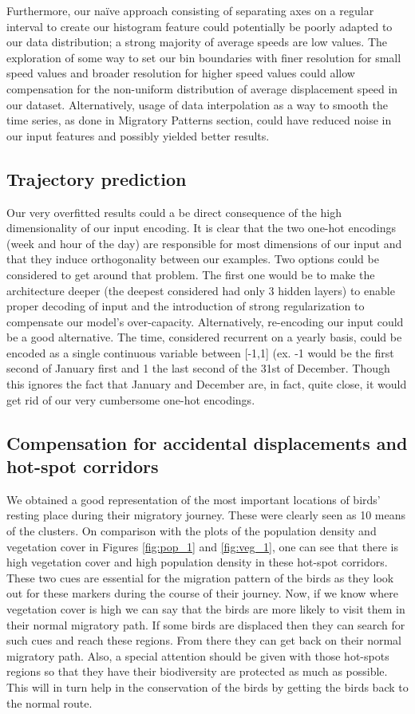 \documentclass[letterpaper, 10pt, conference]{ieeeconf}  %
\begin{document}
Furthermore, our na\"ive approach consisting of separating axes on a regular interval to create our histogram feature could potentially be poorly adapted to our data distribution; a strong majority of average speeds are low values. The exploration of some way to set our bin boundaries with finer resolution for small speed values and broader resolution for higher speed values could allow compensation for the non-uniform distribution of average displacement speed in our dataset. Alternatively, usage of data interpolation as a way to smooth the time series, as done in Migratory Patterns section, could have reduced noise in our input features and possibly yielded better results.

\subsection{Trajectory prediction}
	Our very overfitted results could a be direct consequence of the high dimensionality of our input encoding. It is clear that the two one-hot encodings (week and hour of the day) are responsible for most dimensions of our input and that they induce orthogonality between our examples. Two options could be considered to get around that problem. The first one would be to make the architecture deeper (the deepest considered had only 3 hidden layers) to enable proper decoding of input and the introduction of strong regularization to compensate our model's over-capacity. Alternatively, re-encoding our input could be a good alternative. The time, considered recurrent on a yearly basis, could be encoded as a single continuous variable between [-1,1] (ex. -1 would be the first second of January first and 1 the last second of the 31st of December. Though this ignores the fact that January and December are, in fact, quite close, it would get rid of our very cumbersome one-hot encodings.

\subsection{Compensation for accidental displacements and hot-spot corridors}
	We obtained a good representation of the most important locations of birds' resting place during their migratory journey. These were clearly seen as 10 means of the clusters. On comparison with the plots of the population density and vegetation cover in Figures \ref{fig:pop_1} and  \ref{fig:veg_1}, one can see that there is high vegetation cover and high population density in these hot-spot corridors. These two cues are essential for the migration pattern of the birds as they look out for these markers during the course of their journey. Now, if we know where vegetation cover is high we can say that the birds are more likely to visit them in their normal migratory path. If some birds are displaced then they can search for such cues and reach these regions. From there they can get back on their normal migratory path. Also, a special attention should be given with those hot-spots regions so that they have their biodiversity are protected as much as possible. This will in turn help in the conservation of the birds by getting the birds back to the normal route.
\end{document}
